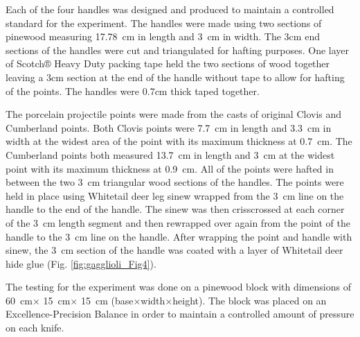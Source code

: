 Each of the four handles was designed and produced to maintain a controlled standard for the experiment. The handles were made using two sections of pinewood measuring \SI{17.78}{\centi\metre} in length and \SI{3}{\centi\metre} in width. The 3cm end sections of the handles were cut and triangulated for hafting purposes. One layer of Scotch® Heavy Duty packing tape held the two sections of wood together leaving a 3cm section at the end of the handle without tape to allow for hafting of the points. The handles were 0.7cm thick taped together.  

The porcelain projectile points were made from the casts of original Clovis and Cumberland points. Both Clovis points were \SI{7.7}{\centi\metre} in length and \SI{3.3}{\centi\metre} in width at the widest area of the point with its maximum thickness at \SI{0.7}{\centi\metre}. The Cumberland points both measured \SI{13.7}{\centi\metre} in length and \SI{3}{\cm} at the widest point with its maximum thickness at \SI{0.9}{\centi\metre}. All of the points were hafted in between the two \SI{3}{\cm} triangular wood sections of the handles. The points were held in place using Whitetail deer leg sinew wrapped from the \SI{3}{\centi\metre} line on the handle to the end of the handle. The sinew was then crisscrossed at each corner of the \SI{3}{\centi\metre} length segment and then rewrapped over again from the point of the handle to the \SI{3}{\centi\metre} line on the handle. After wrapping the point and handle with sinew, the \SI{3}{\centi\metre} section of the handle was coated with a layer of Whitetail deer hide glue (Fig. \ref{fig:gagglioli_Fig4}). 


The testing for the experiment was done on a pinewood block with dimensions of \SI{60}{\centi\metre}$\times$ \SI{15}{\centi\metre}$\times$ \SI{15}{\centi\metre} (base$\times$width$\times$height). The block was placed on an Excellence-Precision Balance in order to maintain a controlled amount of pressure on each knife.

